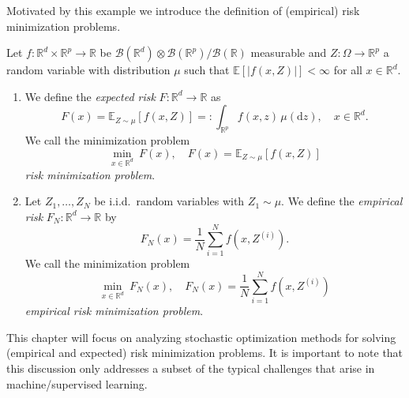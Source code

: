 \documentclass[12pt,openany]{book}
\theoremstyle{definition}
\theoremstyle{definition}
\newcommand{\E}{\mathbb{E}}
\newcommand{\R}{\mathbb{R}}
\newcommand{\dd}{{\mathrm{d}}}
\begin{document}
Motivated by this example we introduce the definition of (empirical) risk minimization problems.

\begin{defi}
Let $f:\R^{d}\times\R^p\to \R$ be $\mathcal B(\R^d)\otimes\mathcal B(\R^p)/\mathcal B(\R)$ measurable and $Z:\Omega\to\R^p$ a random variable with distribution $\mu$ such that $\E[|f(x,Z)|]<\infty$ for all $x\in\R^d$.
\begin{enumerate}
\item We define the \textit{expected risk} $F:\R^d\to\R$ as
\[F(x) = \E_{Z\sim\mu}[f(x,Z)]=:\int_{\R^p}f(x,z)\,\mu(\dd z),\quad x\in\R^d. \]
We call the minimization problem
\[\min_{x\in\R^d}\ F(x),\quad F(x) = \E_{Z\sim\mu}[f(x,Z)] \]
\textit{risk minimization problem}.
\item Let $Z_1,\dots,Z_N$ be i.i.d.~random variables with $Z_1\sim\mu$. We define the \textit{empirical risk} $F_N:\R^d\to\R$ by
\[F_N(x) = \frac{1}{N}\sum_{i=1}^N f(x,Z^{(i)}). \]
We call the minimization problem 
\[\min_{x\in\R^d}\ F_N(x),\quad F_N(x) = \frac{1}{N}\sum_{i=1}^N f(x,Z^{(i)}) \]
\textit{empirical risk minimization problem}.
\end{enumerate}
\end{defi}

This chapter will focus on analyzing stochastic optimization methods for solving (empirical and expected) risk minimization problems.  It is important to note that this discussion only addresses a subset of the typical challenges that arise in machine/supervised learning.
\end{document}
